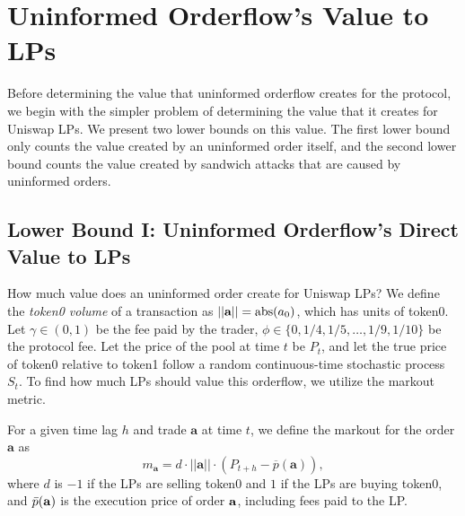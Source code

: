 \section{Uninformed Orderflow's Value to LPs} \label{section:lp-oflow-value}
Before determining the value that uninformed orderflow creates for the protocol, we begin with the simpler problem of determining the value that it creates for Uniswap LPs. We present two lower bounds on this value. The first lower bound only counts the value created by an uninformed order itself, and the second lower bound counts the value created by sandwich attacks that are caused by uninformed orders.
    
\subsection{Lower Bound I: Uninformed Orderflow's Direct Value to LPs}
    How much value does an uninformed order create for Uniswap LPs?
    We define the \textit{token0 volume} of a transaction as $||\textbf a|| = \text{abs}(a_0)$, which has units of token0. Let $\gamma \in (0,1)$ be the fee paid by the trader, $\phi \in \{0, 1/4, 1/5, \dots, 1/9, 1/10 \}$ be the protocol fee. Let the price of the pool at time $t$ be $P_t$, and let the true price of token0 relative to token1 follow a random continuous-time stochastic process $S_t$. To find how much LPs should value this orderflow, we utilize the markout metric.

    \begin{definition}[$h$-Markout]
        For a given time lag $h$ and trade $\textbf{a}$ at time $t$, we define the markout for the order $\textbf{a}$ as 
        $$m_{\textbf{a}} = d \cdot ||\textbf{a}|| \cdot (P_{t + h} - \overline p(\textbf{a})),$$
        where $d$ is $-1$ if the LPs are selling token0 and $1$ if the LPs are buying token0, and $\bar p(\bf a)$ is the execution price of order $\bf a$, including fees paid to the LP.
    \end{definition}

